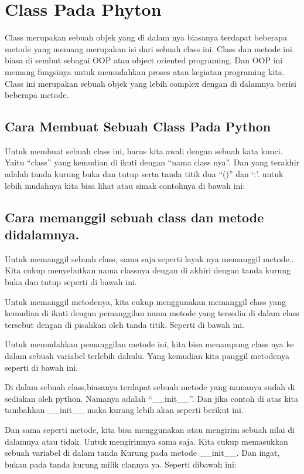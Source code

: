 \chapter{Class Pada Phyton}
\par Class merupakan sebuah objek yang di dalam nya biasanya terdapat beberapa metode yang memang merupakan isi dari sebuah class ini. Class dan metode ini biasa di sembut sebagai OOP atau object oriented programing. Dan OOP ini memang fungsinya untuk memudahkan proses atau kegiatan programing kita. Class ini merupakan sebuah objek yang lebih complex dengan di dalamnya berisi beberapa metode.
\section{Cara Membuat Sebuah Class Pada Python}
Untuk membuat sebuah class ini, harus kita awali dengan sebuah kata kunci. Yaitu “class” yang kemudian di ikuti dengan “nama class nya”. Dan yang terakhir adalah tanda kurung buka dan tutup serta tanda titik dua “()” dan ‘:’.  untuk lebih mudahnya kita bisa lihat atau simak contohnya di bawah ini:

\newpage \section{Cara memanggil sebuah class dan metode didalamnya.}
Untuk memanggil sebuah class, sama saja seperti layak nya memanggil metode.. Kita cukup menyebutkan nama classnya dengan di akhiri dengan tanda kurung buka dan tutup seperti di bawah ini.

Untuk memanggil metodenya, kita cukup menggunakan memanggil class yang kemudian di ikuti dengan pemanggilan nama metode yang tersedia di dalam class tersebut dengan di pisahkan oleh tanda titik. Seperti di bawah ini.

Untuk memudahkan pemanggilan metode ini, kita bisa menampung class nya ke dalam sebuah variabel terlebih dahulu. Yang kemudian kita panggil metodenya seperti di bawah ini.

Di dalam sebuah class,biasanya terdapat sebuah metode yang namanya sudah di sediakan oleh python. Namanya adalah “\_\_init\_\_”. Dan jika contoh di atas kita tambahkan \_\_init\_\_ maka kurang lebih akan seperti berikut ini.

Dan sama seperti metode, kita bisa menggunakan atau mengirim sebuah nilai di dalamnya atau tidak. Untuk mengirimnya sama saja. Kita cukup memasukkan sebuah variabel di dalam tanda Kurung pada metode \_\_init\_\_. Dan ingat, bukan pada tanda kurung milik clannya ya. Seperti dibawah ini:

